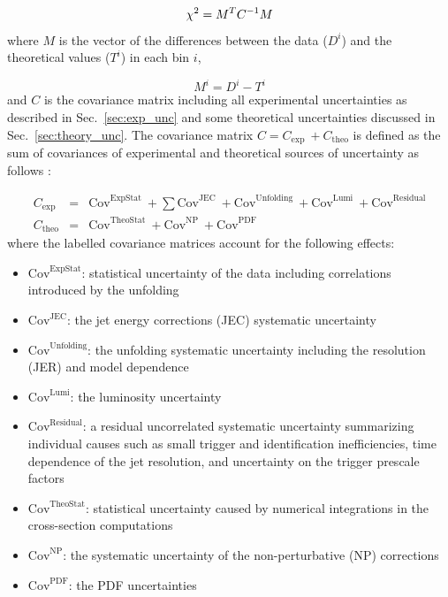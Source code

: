 \begin{equation}
  \label{chisq}
  \chi^2 = M^{T}C^{-1}M
\end{equation}
where $M$ is the vector of the differences between the data ($D^{i}$) and the theoretical values ($T^{i}$) in each bin $i$,

\begin{equation}
 \label{eqn:M_matrix}
 M^{i}=D^{i}-T^{i}
\end{equation}
and $C$ is the covariance matrix including all experimental uncertainties as described in Sec.~\ref{sec:exp_unc} and some theoretical uncertainties discussed in Sec.~\ref{sec:theory_unc}. The covariance matrix $C=C_\mathrm{exp}~\plus C_\mathrm{theo}$ is defined as the sum of covariances of experimental and theoretical sources of uncertainty as follows : 

\begin{eqnarray}
 \label{eqn:c_exp}
 C_\mathrm{exp} &=& \mathrm{Cov}^\mathrm{ExpStat}~\plus \sum\mathrm{Cov}^\mathrm{JEC}~\plus \mathrm{Cov}^\mathrm{Unfolding}~\plus \mathrm{Cov}^\mathrm{Lumi}~\plus \mathrm{Cov}^\mathrm{Residual}\\
 C_\mathrm{theo} &=& \mathrm{Cov}^\mathrm{TheoStat}~\plus \mathrm{Cov}^\mathrm{NP}~\plus \mathrm{Cov}^\mathrm{PDF}
 \label{eqn:c_theo}
\end{eqnarray}
where the labelled covariance matrices account for the following effects:

\begin{itemize}
\item{$\mathrm{Cov}^\mathrm{ExpStat}$: statistical uncertainty of the data including correlations introduced by the unfolding}
\item{$\mathrm{Cov}^\mathrm{JEC}$: the jet energy corrections (JEC) systematic uncertainty}
\item{$\mathrm{Cov}^\mathrm{Unfolding}$: the unfolding systematic uncertainty including the resolution (JER) and model dependence}
\item{$\mathrm{Cov}^\mathrm{Lumi}$: the luminosity uncertainty}
\item{$\mathrm{Cov}^\mathrm{Residual}$: a residual uncorrelated systematic uncertainty summarizing individual causes such as small trigger and identification inefficiencies, time dependence of the jet \pt resolution, and uncertainty on the trigger prescale factors}
\item{$\mathrm{Cov}^\mathrm{TheoStat}$: statistical uncertainty caused by numerical integrations in the cross-section computations}
\item{$\mathrm{Cov}^\mathrm{NP}$: the systematic uncertainty of the non-perturbative (NP) corrections}
\item{$\mathrm{Cov}^\mathrm{PDF}$: the PDF uncertainties}
\end{itemize}

